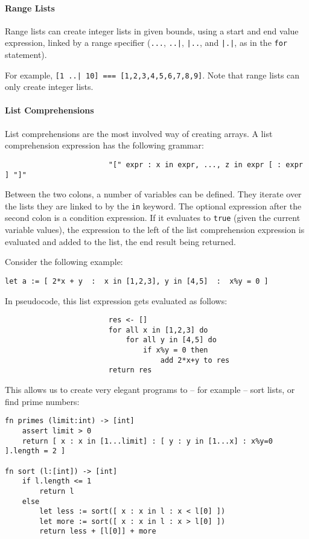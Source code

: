 \documentclass{article}
\newcommand{\code}[1]{\lstinline[columns=fixed]{#1}}
\newcommand{\subsubsubsection}{\paragraph}
\begin{document}
				\subsubsubsection{Range Lists}
				
					Range lists can create integer lists in given bounds, using a start and end value expression, linked by a range specifier (\code{...}, \code{..|}, \code{|..}, and \code{|.|}, as in the \code{for} statement).
					
					For example, \code{[1 ..| 10] === [1,2,3,4,5,6,7,8,9]}. Note that range lists can only create integer lists.
					
				\subsubsubsection{List Comprehensions}
				
					List comprehensions are the most involved way of creating arrays. A list comprehension expression has the following grammar:
					
					\begin{verbatim}
						"[" expr : x in expr, ..., z in expr [ : expr ] "]"
					\end{verbatim}
					
					Between the two colons, a number of variables can be defined. They iterate over the lists they are linked to by the \code{in} keyword. The optional expression after the second colon is a condition expression. If it evaluates to \code{true} (given the current variable values), the expression to the left of the list comprehension expression is evaluated and added to the list, the end result being returned.
					
					Consider the following example:
					
					\begin{lstlisting}
let a := [ 2*x + y  :  x in [1,2,3], y in [4,5]  :  x%y = 0 ]
					\end{lstlisting}
					
					In pseudocode, this list expression gets evaluated as follows:
					
					\begin{verbatim}
						res <- []
						for all x in [1,2,3] do
						    for all y in [4,5] do
						        if x%y = 0 then
						            add 2*x+y to res
						return res
					\end{verbatim}
					
					This allows us to create very elegant programs to -- for example -- sort lists, or find prime numbers:
					
					\begin{lstlisting}
fn primes (limit:int) -> [int]
	assert limit > 0
	return [ x : x in [1...limit] : [ y : y in [1...x] : x%y=0 ].length = 2 ]

fn sort (l:[int]) -> [int]
	if l.length <= 1
		return l
	else
		let less := sort([ x : x in l : x < l[0] ])
		let more := sort([ x : x in l : x > l[0] ])
		return less + [l[0]] + more
					\end{lstlisting}
					
\end{document}
